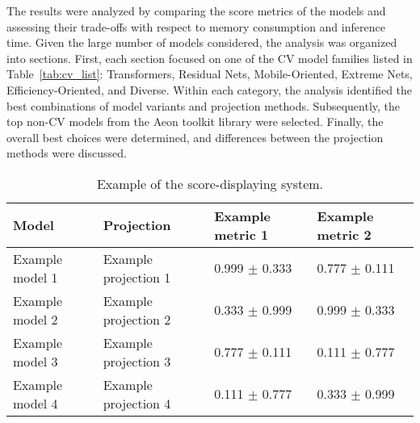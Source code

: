 The results were analyzed by comparing the score metrics of the models and assessing their trade-offs with respect to memory consumption and inference time.  Given the large number of models considered, the analysis was organized into sections. First, each section focused on one of the \gls{CV} model families listed in Table~\ref{tab:cv_list}: Transformers, Residual Nets, Mobile-Oriented, Extreme Nets, Efficiency-Oriented, and Diverse. Within each category, the analysis identified the best combinations of model variants and projection methods. Subsequently, the top non-\gls{CV} models from the Aeon toolkit library were selected. Finally, the overall best choices were determined, and differences between the projection methods were discussed.


\begin{table}[h!]
	\centering
	\caption{Example of the score-displaying system.}
	\begin{tabular}{llll}
		\toprule
		Model & Projection & Example metric 1 & Example metric 2 \\
		\midrule
		Example model 1 & Example projection 1 
			& \textcolor[rgb]{0.0,0.9,0.0}{0.999} $\pm$ \textcolor[rgb]{0.6,0.5,0.0}{0.333} 
			& \textcolor[rgb]{0.6,0.5,0.0}{0.777} $\pm$ \textcolor[rgb]{0.0,0.9,0.0}{0.111} 
		\\
		Example model 2 & Example projection 2 
			& \textcolor[rgb]{0.6,0.5,0.0}{0.333} $\pm$ \textcolor[rgb]{0.9,0.2,0.2}{0.999} 
			& \textcolor[rgb]{0.0,0.9,0.0}{0.999} $\pm$ \textcolor[rgb]{0.6,0.5,0.0}{0.333} 
		\\
		Example model 3 & Example projection 3 
			& \textcolor[rgb]{0.6,0.5,0.0}{0.777} $\pm$ \textcolor[rgb]{0.0,0.9,0.0}{0.111} 
			& \textcolor[rgb]{0.9,0.2,0.2}{0.111} $\pm$ \textcolor[rgb]{0.6,0.5,0.0}{0.777} 
		\\
		Example model 4 & Example projection 4 
			& \textcolor[rgb]{0.9,0.2,0.2}{0.111} $\pm$ \textcolor[rgb]{0.6,0.5,0.0}{0.777} 
			& \textcolor[rgb]{0.6,0.5,0.0}{0.333} $\pm$ \textcolor[rgb]{0.9,0.2,0.2}{0.999} 
		\\ 
		\bottomrule
	\end{tabular}
	\label{tab:experiments:example}
\end{table}

